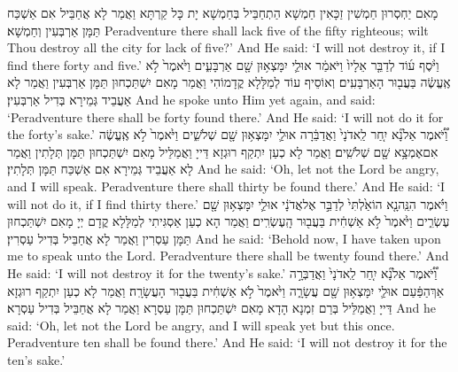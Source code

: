 {מָאִם יַחְסְרוּן חַמְשִׁין זַכָּאִין חַמְשָׁא הַתְחַבֵּיל בְּחַמְשָׁא יָת כָּל קַרְתָּא וַאֲמַר לָא אֲחַבֵּיל אִם אַשְׁכַּח תַּמָּן אַרְבְּעִין וְחַמְשָׁא׃}
{Peradventure there shall lack five of the fifty righteous; wilt Thou destroy all the city for lack of five?’ And He said: ‘I will not destroy it, if I find there forty and five.’}{}
{וַיֹּ֨סֶף ע֜וֹד לְדַבֵּ֤ר אֵלָיו֙ וַיֹּאמַ֔ר אוּלַ֛י יִמָּצְא֥וּן שָׁ֖ם אַרְבָּעִ֑ים וַיֹּ֙אמֶר֙ לֹ֣א אֶֽעֱשֶׂ֔ה בַּעֲב֖וּר הָאַרְבָּעִֽים׃}
{וְאוֹסֵיף עוֹד לְמַלָּלָא קֳדָמוֹהִי וַאֲמַר מָאִם יִשְׁתַּכְחוּן תַּמָּן אַרְבְּעִין וַאֲמַר לָא אַעֲבֵיד גְּמֵירָא בְּדִיל אַרְבְּעִין׃}
{And he spoke unto Him yet again, and said: ‘Peradventure there shall be forty found there.’ And He said: ‘I will not do it for the forty’s sake.’}{}
{וַ֠יֹּ֠אמֶר אַל\maqqaf נָ֞א יִ֤חַר לַֽאדֹנָי֙ וַאֲדַבֵּ֔רָה אוּלַ֛י יִמָּצְא֥וּן שָׁ֖ם שְׁלֹשִׁ֑ים וַיֹּ֙אמֶר֙ לֹ֣א אֶֽעֱשֶׂ֔ה אִם\maqqaf אֶמְצָ֥א שָׁ֖ם שְׁלֹשִֽׁים׃}
{וַאֲמַר לָא כְעַן יִתְקַף רוּגְזָא דַּייָ וַאֲמַלֵּיל מָאִם יִשְׁתַּכְחוּן תַּמָּן תְּלָתִין וַאֲמַר לָא אַעֲבֵיד גְּמֵירָא אִם אַשְׁכַּח תַּמָּן תְּלָתִין׃}
{And he said: ‘Oh, let not the Lord be angry, and I will speak. Peradventure there shall thirty be found there.’ And He said: ‘I will not do it, if I find thirty there.’}{}
{וַיֹּ֗אמֶר הִנֵּֽה\maqqaf נָ֤א הוֹאַ֙לְתִּי֙ לְדַבֵּ֣ר אֶל\maqqaf אֲדֹנָ֔י אוּלַ֛י יִמָּצְא֥וּן שָׁ֖ם עֶשְׂרִ֑ים וַיֹּ֙אמֶר֙ לֹ֣א אַשְׁחִ֔ית בַּעֲב֖וּר הָֽעֶשְׂרִֽים׃}
{וַאֲמַר הָא כְעַן אַסְגִּיתִי לְמַלָּלָא קֳדָם יְיָ מָאִם יִשְׁתַּכְחוּן תַּמָּן עַסְרִין וַאֲמַר לָא אֲחַבֵּיל בְּדִיל עַסְרִין׃}
{And he said: ‘Behold now, I have taken upon me to speak unto the Lord. Peradventure there shall be twenty found there.’ And He said: ‘I will not destroy it for the twenty’s sake.’}{}
{וַ֠יֹּ֠אמֶר אַל\maqqaf נָ֞א יִ֤חַר לַֽאדֹנָי֙ וַאֲדַבְּרָ֣ה אַךְ\maqqaf הַפַּ֔עַם אוּלַ֛י יִמָּצְא֥וּן שָׁ֖ם עֲשָׂרָ֑ה וַיֹּ֙אמֶר֙ לֹ֣א אַשְׁחִ֔ית בַּעֲב֖וּר הָעֲשָׂרָֽה׃}
{וַאֲמַר לָא כְעַן יִתְקַף רוּגְזָא דַּייָ וַאֲמַלֵּיל בְּרַם זִמְנָא הָדָא מָאִם יִשְׁתַּכְחוּן תַּמָּן עַסְרָא וַאֲמַר לָא אֲחַבֵּיל בְּדִיל עַסְרָא׃}
{And he said: ‘Oh, let not the Lord be angry, and I will speak yet but this once. Peradventure ten shall be found there.’ And He said: ‘I will not destroy it for the ten’s sake.’}{}
